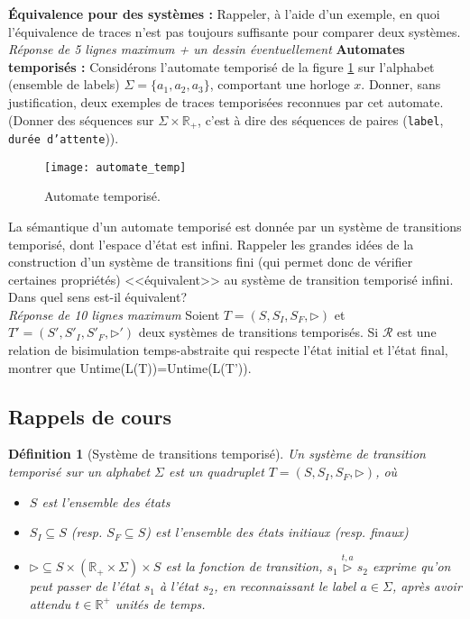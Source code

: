 \documentclass[a4paper]{article}
\newtheorem{definition}{Définition}
\begin{document}
\begin{questions}
\question \textbf{Équivalence pour des systèmes : } Rappeler, à l'aide d'un exemple, en quoi l'équivalence de traces n'est
	pas toujours suffisante pour comparer deux systèmes.\\
	\emph{Réponse de 5 lignes maximum + un dessin éventuellement}
\question \textbf{Automates temporisés : } Considérons l'automate temporisé de la figure \ref{automateT} sur l'alphabet (ensemble de labels)
	$\Sigma=\{a_1,a_2,a_3\}$, comportant une horloge $x$. Donner, sans justification,  deux exemples de traces temporisées reconnues par cet
	automate. (Donner des séquences sur $\Sigma \times \mathbb{R}_+$, c'est à dire des séquences de paires (\texttt{label}, 
	\texttt{durée d'attente})).
	\begin{figure}[!h]
		\begin{center}
		\texttt{[image: automate\_temp]}
		\end{center}
		\caption{Automate temporisé.}
		\label{automateT}
	\end{figure}
\question La sémantique d'un automate temporisé est donnée par un système de transitions temporisé, dont l'espace d'état est infini.
	Rappeler les grandes idées de la construction d'un système de transitions fini (qui permet donc de vérifier certaines propriétés)
	<<équivalent>> au système de transition temporisé infini. Dans quel sens est-il équivalent?\\
	\emph{Réponse de 10 lignes maximum }
\question Soient $T=(S,S_I,S_F,\rhd )$ et $T'=(S',S'_I,S'_F,\rhd')$ deux systèmes de transitions temporisés. Si $\mathcal{R}$ est une
	relation de bisimulation temps-abstraite qui respecte l'état
        initial et l'état final, montrer que \linebreak Untime(L(T))=Untime(L(T')).
\end{questions}

\subsection*{Rappels de cours}
\begin{definition}[Système de transitions temporisé]
Un système de transition temporisé sur un alphabet $\Sigma$ est un quadruplet
$T=(S,S_I,S_F,\rhd)$, où
\begin{itemize}
\item $S$ est l'ensemble des états
\item $S_I \subseteq S$ (resp. $S_F\subseteq S$) est l'ensemble des états initiaux (resp. finaux)
\item $\rhd \subseteq S \times (\mathbb{R}_+ \times \Sigma) \times S$
  est la fonction de transition, $s_1 \overset{t,a}{\rhd}s_2$ exprime
  qu'on peut passer de l'état $s_1$ à l'état $s_2$, en reconnaissant
  le label $a\in \Sigma$, après avoir attendu $t\in \mathbb{R}^+$
  unités de temps.
\end{itemize} 
\end{definition}
\end{document}
